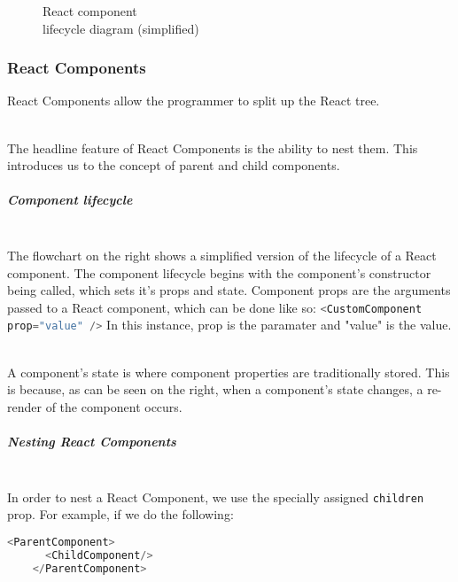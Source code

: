 \documentclass[../../main.tex]{subfiles}
\begin{document}
\begin{dummyenv}
\begin{wrapfigure}{r}[25pt]{0.4\textwidth}
\begin{framed}{}
{
      }

      \caption{
        \centering
        React component\\
        lifecycle diagram (simplified)
      }
    \end{framed}
    \label{fig:wrapfig}
  \end{wrapfigure}

  \paragraph{} %

  \subsubsection{React Components}

  \noindent React Components allow the programmer to split up the React tree.

  \noindent \\ The headline feature of React Components is
  the ability to nest them. This introduces us to the concept
  of parent and child components.

  \subparagraph{Component lifecycle\\}

  \noindent \\ The flowchart on the right shows a simplified version of the lifecycle
  of a React component. The component lifecycle begins with the component's constructor
  being called, which sets it's props and state. Component props are the arguments passed to
  a React component, which can be done like so:
  \lstinline[language=typescript]{<CustomComponent prop="value" />}
  In this instance, prop is the paramater and "value" is the value.

  \noindent \\ A component's state is where component properties are traditionally stored.
  This is because, as can be seen on the right, when a component's state changes, a re-render
  of the component occurs.

  \subparagraph{Nesting React Components\\}

  \noindent \\ In order to nest a React Component, we use the specially assigned
  \lstinline{children} prop. For example, if we do the following:

  \begin{lstlisting}[language=typescript]
    <ParentComponent>
      <ChildComponent/>
    </ParentComponent>
  \end{lstlisting}
\end{dummyenv}
\end{document}
